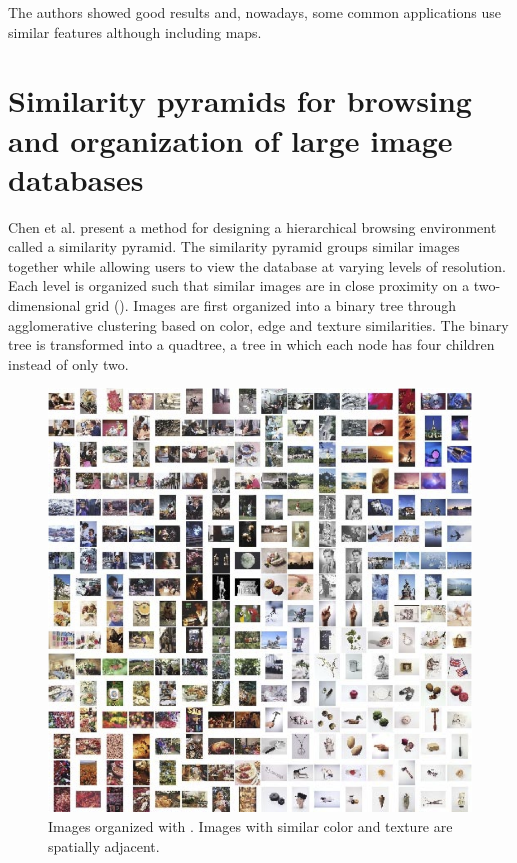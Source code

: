 The authors showed good results and, nowadays, some common applications use similar features although including maps.

\section{Similarity pyramids for browsing and organization of large image databases} %
\label{sub:Chen}

Chen et al. \cite{Chen:1998p2344} present a method for designing a hierarchical browsing environment called a similarity pyramid. The similarity pyramid groups similar images together while allowing users to view the database at varying levels of resolution. Each level is organized such that similar images are in close proximity on a two-dimensional grid (). Images are first organized into a binary tree through agglomerative clustering based on color, edge and texture similarities. The binary tree is transformed into a quadtree, a tree in which each node has four children instead of only two.

\begin{figure}[ht]
	\centering
		\includegraphics[scale=0.8]{imgs-RelatedWork/Chen-1998p2344.png}
	\caption{Images organized with \cite{Chen:1998p2344}. Images with similar color and texture are spatially adjacent.}
	\label{fig:Chen1}
\end{figure}

